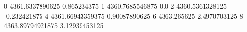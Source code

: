 0 4361.6337890625 0.865234375
1 4360.7685546875 0.0
2 4360.5361328125 -0.232421875
4 4361.66943359375 0.90087890625
6 4363.265625 2.4970703125
8 4363.89794921875 3.12939453125
